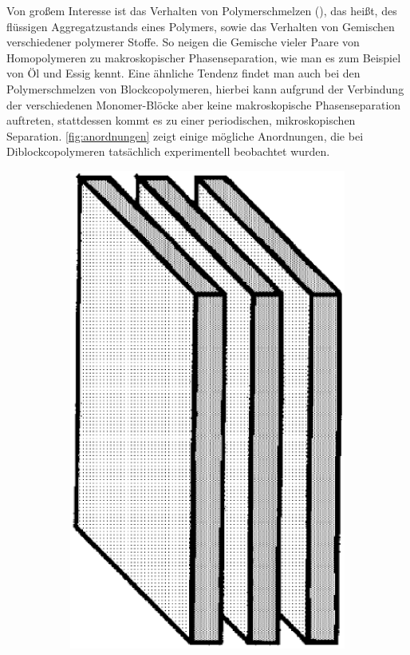 Von großem Interesse ist das Verhalten von Polymerschmelzen (), das heißt, des flüssigen Aggregatzustands eines Polymers, sowie das Verhalten von Gemischen verschiedener polymerer Stoffe.
So neigen die Gemische vieler Paare von Homopolymeren zu makroskopischer Phasenseparation, wie man es zum Beispiel von Öl und Essig kennt.
Eine ähnliche Tendenz findet man auch bei den Polymerschmelzen von Blockcopolymeren, hierbei kann aufgrund der Verbindung der verschiedenen Monomer-Blöcke aber keine makroskopische Phasenseparation auftreten, stattdessen kommt es zu einer periodischen, mikroskopischen Separation.
\autoref{fig:anordnungen} zeigt einige mögliche Anordnungen, die bei Diblockcopolymeren tatsächlich experimentell beobachtet wurden.

\begin{figure}[tb]
    \centering
    \begin{subfigure}[b]{0.18\textwidth}
        \includegraphics[width=\textwidth]{figures/einleitung/fig1}

\end{subfigure}
\end{figure}
